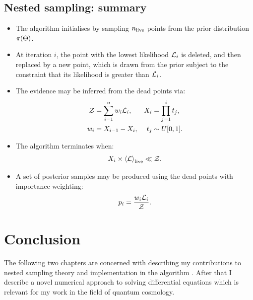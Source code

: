 \subsection{Nested sampling: summary}
\label{sec:bay:comp_space}
\begin{itemize}
  \item The algorithm initialises by sampling \(n_{\mathrm{live}}\) points from the prior distribution \(\pi(\Theta)\). 
  \item At iteration \(i\), the point with the lowest likelihood \(\mathcal{L}_i\) is deleted, and then replaced by a new point, which is drawn from the prior subject to the constraint that its likelihood is greater than \(\mathcal{L}_i\). 
  \item The evidence may be inferred from the dead points via:
    \begin{align}
      \mathcal{Z} &= \sum_{i=1}^n w_i \mathcal{L}_i, &
      X_i &= \prod_{j=1}^{i} t_j, \nonumber \\
      w_i &= X_{i-1}-X_{i},  & 
      t_j &\sim U[0,1].\nonumber 
    \end{align}
  \item The algorithm terminates when:
    \begin{equation}
      X_i \times {\left\langle{\mathcal{L}}\right\rangle}_{\mathrm{live}} \ll \mathcal{Z}.\nonumber
    \end{equation}
  \item A set of posterior samples may be produced using the dead points with importance weighting:
    \begin{equation}
      p_i = \frac{w_i\mathcal{L}_i}{\mathcal{Z}}.\nonumber
    \end{equation}

\end{itemize}


\section{Conclusion}
The following two chapters are concerned with describing my contributions to nested sampling theory and implementation in the algorithm \PolyChord{}. After that I describe a novel numerical approach to solving differential equations which is relevant for my work in the field of quantum cosmology.

\begin{subappendices}
  
\end{subappendices}


